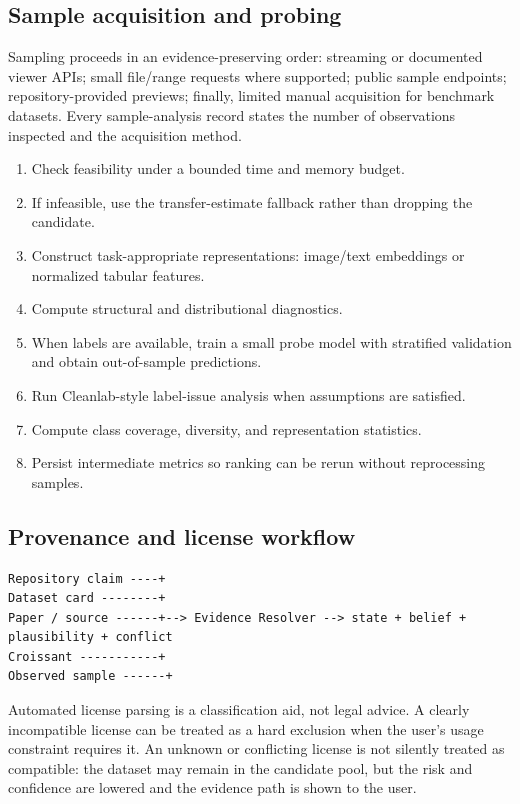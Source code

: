 \documentclass[11pt]{article}
\begin{document}
\subsection{Sample acquisition and probing}
Sampling proceeds in an evidence-preserving order: streaming or documented viewer APIs; small file/range
requests where supported; public sample endpoints; repository-provided previews; finally, limited manual
acquisition for benchmark datasets. Every sample-analysis record states the number of observations
inspected and the acquisition method.
\begin{enumerate}[leftmargin=*]
\item Check feasibility under a bounded time and memory budget.
\item If infeasible, use the transfer-estimate fallback rather than dropping the candidate.
\item Construct task-appropriate representations: image/text embeddings or normalized tabular features.
\item Compute structural and distributional diagnostics.
\item When labels are available, train a small probe model with stratified validation and obtain
      out-of-sample predictions.
\item Run Cleanlab-style label-issue analysis when assumptions are satisfied.
\item Compute class coverage, diversity, and representation statistics.
\item Persist intermediate metrics so ranking can be rerun without reprocessing samples.
\end{enumerate}

\subsection{Provenance and license workflow}
\begin{lstlisting}[basicstyle=\ttfamily\footnotesize]
Repository claim ----+
Dataset card --------+
Paper / source ------+--> Evidence Resolver --> state + belief + plausibility + conflict
Croissant -----------+
Observed sample ------+
\end{lstlisting}
Automated license parsing is a classification aid, not legal advice. A clearly incompatible license can be
treated as a hard exclusion when the user's usage constraint requires it. An unknown or conflicting license
is not silently treated as compatible: the dataset may remain in the candidate pool, but the risk and
confidence are lowered and the evidence path is shown to the user.
\end{document}
